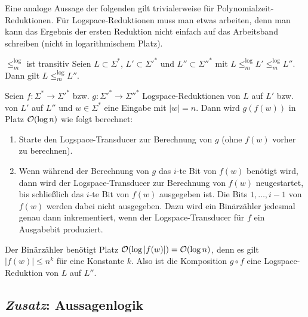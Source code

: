 \begin{Bem}
    Eine analoge Aussage der folgenden gilt trivialerweise für Polynomialzeit-Reduk\-tionen.
    Für Logspace-Reduktionen muss man etwas arbeiten,
    denn man kann das Ergebnis der ersten Reduktion nicht einfach auf das Arbeitsband schreiben
    (nicht in logarithmischem Platz).
\end{Bem}

\begin{Satz}{$\le_m^{\log}$ ist transitiv}
    Seien $L \subset \Sigma^\ast$, $L' \subset \Sigma'^\ast$ und $L'' \subset \Sigma''^\ast$
    mit $L \le_m^{\log} L' \le_m^{\log} L''$.\\
    Dann gilt $L \le_m^{\log} L''$.
\end{Satz}

\begin{Beweis}
    Seien $f\colon \Sigma^\ast \rightarrow \Sigma'^\ast$ bzw.
    $g\colon \Sigma'^\ast \rightarrow \Sigma''^\ast$ Logspace-Reduktionen von $L$ auf $L'$
    bzw. von $L'$ auf $L''$ und $w \in \Sigma^\ast$ eine Eingabe mit $|w| = n$.
    Dann wird $g(f(w))$ in Platz $\mathcal{O}(\log n)$ wie folgt berechnet:
    \begin{enumerate}
        \item
        Starte den Logspace-Transducer zur Berechnung von $g$ (ohne $f(w)$ vorher zu berechnen).
        
        \item
        Wenn während der Berechnung von $g$ das $i$-te Bit von $f(w)$ benötigt wird,
        dann wird der Logspace-Transducer zur Berechnung von $f(w)$ neugestartet,
        bis schließlich das $i$-te Bit von $f(w)$ ausgegeben ist.
        Die Bits $1, \dotsc, i - 1$ von $f(w)$ werden dabei nicht ausgegeben.
        Dazu wird ein Binärzähler jedesmal genau dann inkrementiert, wenn
        der Logspace-Transducer für $f$ ein Ausgabebit produziert.
    \end{enumerate}
    Der Binärzähler benötigt Platz $\mathcal{O}(\log |f(w)|) = \mathcal{O}(\log n)$,
    denn es gilt $|f(w)| \le n^k$ für eine Konstante $k$.
    Also ist die Komposition $g \circ f$ eine Logspace-Reduktion von $L$ auf $L''$.
\end{Beweis}

\pagebreak

\subsection{%
    \emph{Zusatz}: Aussagenlogik%
}

